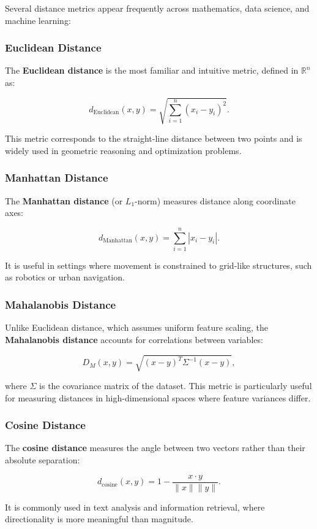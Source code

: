 Several distance metrics appear frequently across mathematics, data science, and machine learning:

\subsubsection{Euclidean Distance}
The \textbf{Euclidean distance} is the most familiar and intuitive metric, defined in \( \mathbb{R}^n \) as:

\[
d_{\text{Euclidean}}(x, y) = \sqrt{\sum_{i=1}^{n} (x_i - y_i)^2}.
\]

This metric corresponds to the straight-line distance between two points and is widely used in geometric reasoning and optimization problems.

\subsubsection{Manhattan Distance}
The \textbf{Manhattan distance} (or \( L_1 \)-norm) measures distance along coordinate axes:

\[
d_{\text{Manhattan}}(x, y) = \sum_{i=1}^{n} |x_i - y_i|.
\]

It is useful in settings where movement is constrained to grid-like structures, such as robotics or urban navigation.

\subsubsection{Mahalanobis Distance}
Unlike Euclidean distance, which assumes uniform feature scaling, the \textbf{Mahalanobis distance} accounts for correlations between variables:

\[
D_M(x, y) = \sqrt{(x - y)^T \Sigma^{-1} (x - y)},
\]

where \( \Sigma \) is the covariance matrix of the dataset. This metric is particularly useful for measuring distances in high-dimensional spaces where feature variances differ.

\subsubsection{Cosine Distance}
The \textbf{cosine distance} measures the angle between two vectors rather than their absolute separation:

\[
d_{\text{cosine}}(x, y) = 1 - \frac{x \cdot y}{\|x\| \|y\|}.
\]

It is commonly used in text analysis and information retrieval, where directionality is more meaningful than magnitude.

